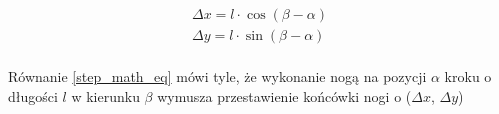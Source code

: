 \begin{equation} \label{step_math_eq}
\begin{split}
\Delta x = l \cdot \cos(\beta - \alpha)\\
\Delta y = l \cdot \sin(\beta - \alpha)\\
\end{split}
\end{equation}

Równanie \ref{step_math_eq} mówi tyle, że wykonanie nogą na pozycji $\alpha$ kroku o długości $l$ w kierunku $\beta$ wymusza przestawienie końcówki nogi o ($\Delta x$, $\Delta y$)


